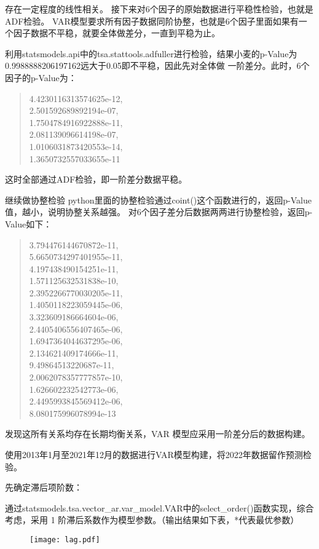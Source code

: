 \documentclass[a4paper,AutoFakeBold,AutoFakeSlant]{ctexart}
\begin{document}
存在一定程度的线性相关。
接下来对6个因子的原始数据进行平稳性检验，也就是ADF检验。
VAR模型要求所有因子数据同阶协整，也就是6个因子里面如果有一个因子数据不平稳，就要全体做差分，一直到平稳为止。

利用statsmodels.api中的tsa.stattools.adfuller进行检验，结果小麦的p-Value为\\0.9988888206197162远大于0.05即不平稳，因此先对全体做
一阶差分。此时，6个因子的p-Value为：
\begin{quote}
  4.4230116313574625e-12,\\
  2.501592689892194e-07,\\
  1.7504784916922888e-11,\\
  2.081139096614198e-07,\\
  1.0106031873420553e-14,\\
  1.3650732557033655e-11
\end{quote}
这时全部通过ADF检验，即一阶差分数据平稳。

继续做协整检验
python里面的协整检验通过coint()这个函数进行的，返回p-Value值，越小，说明协整关系越强。
对6个因子差分后数据两两进行协整检验，返回p-Value如下：
\begin{quote}
  3.794476144670872e-11,\\
 5.6650734297401955e-11,\\
 4.197438490154251e-11,\\
 1.571125632531838e-10,\\
 2.3952266770030205e-11,\\
 1.4050118223059445e-06,\\
 3.323609186664604e-06,\\
 2.4405406556407465e-06,\\
 1.6947364044637295e-06,\\
 2.134621409174666e-11,\\
 9.49864513220687e-11,\\
 2.0062078357777857e-10,\\
 1.626602232542773e-06,\\
 2.4495993845569412e-06,\\
 8.080175996078994e-13
\end{quote}
发现这所有关系均存在长期均衡关系，VAR 模型应采用一阶差分后的数据构建。

使用2013年1月至2021年12月的数据进行VAR模型构建，将2022年数据留作预测检验。

先确定滞后项阶数：

通过statsmodels.tsa.vector\_ar.var\_model.VAR中的select\_order()函数实现，综合考虑，采用 1 阶滞后系数作为模型参数。（输出结果如下表，*代表最优参数）
\begin{figure}[htbp]
  \centering
  \texttt{[image: lag.pdf]}
  \label{f10}
\end{figure}
\end{document}
